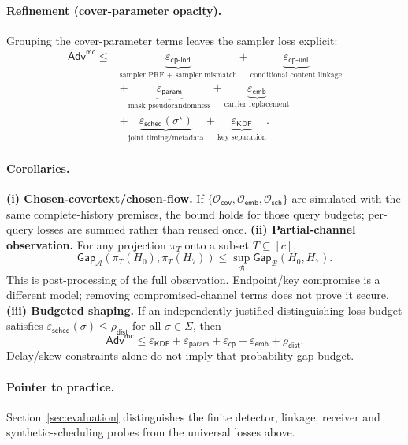 \documentclass[pdflatex,sn-mathphys-num]{sn-jnl}%
\theoremstyle{definition}
\theoremstyle{game}
\theoremstyle{thmstyleone}%
\theoremstyle{thmstyletwo}%
\theoremstyle{thmstylethree}%
\begin{document}
\paragraph{Refinement (cover-parameter opacity).}
Grouping the cover-parameter terms leaves the sampler loss explicit:
\[
\begin{aligned}
\mathsf{Adv}^{\mathsf{mc}}\le{}&
\underbrace{\varepsilon_{\mathsf{cp\text{-}ind}}}_{\text{sampler PRF + sampler mismatch}}
+\underbrace{\varepsilon_{\mathsf{cp\text{-}unl}}}_{\text{conditional content linkage}}\\
&+\underbrace{\varepsilon_{\mathsf{param}}}_{\text{mask pseudorandomness}}
+\underbrace{\varepsilon_{\mathsf{emb}}}_{\text{carrier replacement}}\\
&+\underbrace{\varepsilon_{\mathsf{sched}}(\sigma^\star)}_{\text{joint timing/metadata}}
+\underbrace{\varepsilon_{\mathsf{KDF}}}_{\text{key separation}}.
\end{aligned}
\]
\paragraph{Corollaries.}
\textbf{(i) Chosen-covertext/chosen-flow.}
If $\{\mathcal O_{\mathsf{cov}},\mathcal O_{\mathsf{emb}},\mathcal O_{\mathsf{sch}}\}$
are simulated with the same complete-history premises, the bound holds for
those query budgets; per-query losses are summed rather than reused once.
\textbf{(ii) Partial-channel observation.}
For any projection $\pi_T$ onto a subset $T\subseteq[c]$,
\[
\mathsf{Gap}_{\mathcal A}(\pi_T(H_0),\pi_T(H_7))
\le\sup_{\mathcal B}\mathsf{Gap}_{\mathcal B}(H_0,H_7).
\]
This is post-processing of the full observation. Endpoint/key compromise is
a different model; removing compromised-channel terms does not prove it secure.
\textbf{(iii) Budgeted shaping.}
If an independently justified distinguishing-loss budget satisfies
$\varepsilon_{\mathsf{sched}}(\sigma)\le\rho_{\mathsf{dist}}$ for all
$\sigma\in\Sigma$, then
\[
\mathsf{Adv}^{\mathsf{mc}}\le
\varepsilon_{\mathsf{KDF}}+\varepsilon_{\mathsf{param}}+
\varepsilon_{\mathsf{cp}}+\varepsilon_{\mathsf{emb}}+\rho_{\mathsf{dist}}.
\]
Delay/skew constraints alone do not imply that probability-gap budget.
\paragraph{Pointer to practice.}
Section~\ref{sec:evaluation} distinguishes the finite detector, linkage,
receiver and synthetic-scheduling probes from the universal losses above.
\end{document}

